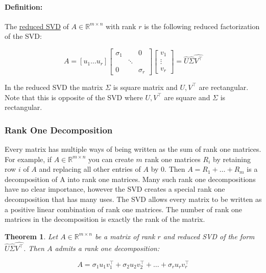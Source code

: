 \documentclass{article}
\newtheorem{theorem}{Theorem}
\begin{document}
\paragraph{Definition:} The \underline{reduced SVD} of $A\in \mathbb{R}^{m\times n}$ with rank $r$ is the following reduced factorization of the SVD:

$$A=[ u_1 \dots u_r]\begin{bmatrix}\sigma_1&&0 \\&\ddots\\0&&\sigma_r\end{bmatrix}\begin{bmatrix}v_1\\\vdots \\ v_r\end{bmatrix}=\hat{U}\hat{\Sigma}\hat{V^\top}$$

In the reduced SVD the matrix $\Sigma$ is square matrix and $U,V^\top$ are rectangular. Note that this is opposite of the SVD where $U,V^\top$ are square and $\Sigma$ is rectangular.

\subsubsection{Rank One Decomposition}
Every matrix has multiple ways of being written as the sum of rank one matrices. For example, if $A\in\mathbb{R}^{m\times n}$ you can create $m$ rank one matrices $R_i$ by retaining row $i$ of $A$ and replacing all other entries of $A$ by 0. Then $A=R_1+\dots+R_m$ is a decomposition of A into rank one matrices. Many such rank one decompositions have no clear importance, however the SVD creates a special rank one decomposition that has many uses. The SVD allows
every matrix to be written as a positive linear combination of rank one matrices. The number of rank one
matrices in the decomposition is exactly the rank of the matrix.

\begin{theorem}
Let $A\in\mathbb{R}^{m\times n}$ be a matrix of rank $r$ and reduced SVD of the form $\hat{U}\hat{\Sigma}\hat{V^\top}$. Then $A$ admits a rank one decomposition:

$$A=\sigma_1u_1v^\top_1+\sigma_2u_2v^\top_2+\dots+\sigma_ru_rv^\top_r$$
\end{theorem}
\end{document}

